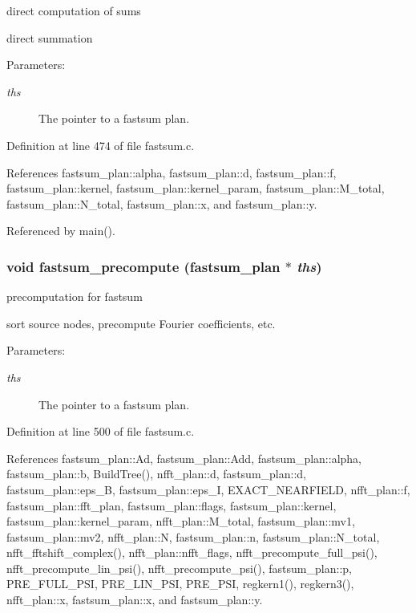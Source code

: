 direct computation of sums 

direct summation

\begin{Desc}
\item[Parameters:]
\begin{description}
\item[{\em ths}]The pointer to a fastsum plan. \end{description}
\end{Desc}


Definition at line 474 of file fastsum.c.

References fastsum\_\-plan::alpha, fastsum\_\-plan::d, fastsum\_\-plan::f, fastsum\_\-plan::kernel, fastsum\_\-plan::kernel\_\-param, fastsum\_\-plan::M\_\-total, fastsum\_\-plan::N\_\-total, fastsum\_\-plan::x, and fastsum\_\-plan::y.

Referenced by main().\hypertarget{group__applications__fastsum_g197c16fcec7935886fc97d140f2b20ff}{
\subsubsection{\setlength{\rightskip}{0pt plus 5cm}void fastsum\_\-precompute ({\bf fastsum\_\-plan} $\ast$ {\em ths})}}
\label{group__applications__fastsum_g197c16fcec7935886fc97d140f2b20ff}


precomputation for fastsum 

sort source nodes, precompute Fourier coefficients, etc.

\begin{Desc}
\item[Parameters:]
\begin{description}
\item[{\em ths}]The pointer to a fastsum plan. \end{description}
\end{Desc}


Definition at line 500 of file fastsum.c.

References fastsum\_\-plan::Ad, fastsum\_\-plan::Add, fastsum\_\-plan::alpha, fastsum\_\-plan::b, BuildTree(), nfft\_\-plan::d, fastsum\_\-plan::d, fastsum\_\-plan::eps\_\-B, fastsum\_\-plan::eps\_\-I, EXACT\_\-NEARFIELD, nfft\_\-plan::f, fastsum\_\-plan::fft\_\-plan, fastsum\_\-plan::flags, fastsum\_\-plan::kernel, fastsum\_\-plan::kernel\_\-param, nfft\_\-plan::M\_\-total, fastsum\_\-plan::mv1, fastsum\_\-plan::mv2, nfft\_\-plan::N, fastsum\_\-plan::n, fastsum\_\-plan::N\_\-total, nfft\_\-fftshift\_\-complex(), nfft\_\-plan::nfft\_\-flags, nfft\_\-precompute\_\-full\_\-psi(), nfft\_\-precompute\_\-lin\_\-psi(), nfft\_\-precompute\_\-psi(), fastsum\_\-plan::p, PRE\_\-FULL\_\-PSI, PRE\_\-LIN\_\-PSI, PRE\_\-PSI, regkern1(), regkern3(), nfft\_\-plan::x, fastsum\_\-plan::x, and fastsum\_\-plan::y.

